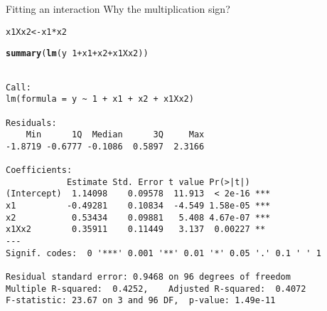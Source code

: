 \documentclass[10pt]{beamer}\usepackage[]{graphicx}\usepackage[]{color}
\makeatletter
\newcommand{\hlnum}[1]{\textcolor[rgb]{0.686,0.059,0.569}{#1}}%
\newcommand{\hlopt}[1]{\textcolor[rgb]{0,0,0}{#1}}%
\newcommand{\hlstd}[1]{\textcolor[rgb]{0.345,0.345,0.345}{#1}}%
\newcommand{\hlkwb}[1]{\textcolor[rgb]{0.69,0.353,0.396}{#1}}%
\newcommand{\hlkwd}[1]{\textcolor[rgb]{0.737,0.353,0.396}{\textbf{#1}}}%
\newenvironment{kframe}{%
 \def\at@end@of@kframe{}%
 \ifinner\ifhmode%
  \def\at@end@of@kframe{\end{minipage}}%
  \begin{minipage}{\columnwidth}%
 \fi\fi%
 \def\FrameCommand##1{\hskip\@totalleftmargin \hskip-\fboxsep
 \colorbox{shadecolor}{##1}\hskip-\fboxsep
     \hskip-\linewidth \hskip-\@totalleftmargin \hskip\columnwidth}%
 \MakeFramed {\advance\hsize-\width
   \@totalleftmargin\z@ \linewidth\hsize
   \@setminipage}}%
 {\par\unskip\endMakeFramed%
 \at@end@of@kframe}
\newenvironment{knitrout}{}{} %
\makeatother
\begin{document}
\begin{frame}[fragile]{Fitting an interaction}
Why the multiplication sign?
\pause
\begin{knitrout}\small
{}\color{fgcolor}\begin{kframe}
\begin{alltt}
\hlstd{x1Xx2} \hlkwb{<-} \hlstd{x1}\hlopt{*}\hlstd{x2}
\end{alltt}
\end{kframe}
\end{knitrout}
\pause
\begin{knitrout}\small
{}\color{fgcolor}\begin{kframe}
\begin{alltt}
     \hlkwd{summary}\hlstd{(}\hlkwd{lm}\hlstd{(y}\hlopt{~} \hlnum{1} \hlopt{+} \hlstd{x1} \hlopt{+} \hlstd{x2} \hlopt{+} \hlstd{x1Xx2))}
\end{alltt}
\begin{verbatim}

Call:
lm(formula = y ~ 1 + x1 + x2 + x1Xx2)

Residuals:
    Min      1Q  Median      3Q     Max 
-1.8719 -0.6777 -0.1086  0.5897  2.3166 

Coefficients:
            Estimate Std. Error t value Pr(>|t|)    
(Intercept)  1.14098    0.09578  11.913  < 2e-16 ***
x1          -0.49281    0.10834  -4.549 1.58e-05 ***
x2           0.53434    0.09881   5.408 4.67e-07 ***
x1Xx2        0.35911    0.11449   3.137  0.00227 ** 
---
Signif. codes:  0 '***' 0.001 '**' 0.01 '*' 0.05 '.' 0.1 ' ' 1

Residual standard error: 0.9468 on 96 degrees of freedom
Multiple R-squared:  0.4252,	Adjusted R-squared:  0.4072 
F-statistic: 23.67 on 3 and 96 DF,  p-value: 1.49e-11
\end{verbatim}
\end{kframe}
\end{knitrout}

\end{frame}
\end{document}

